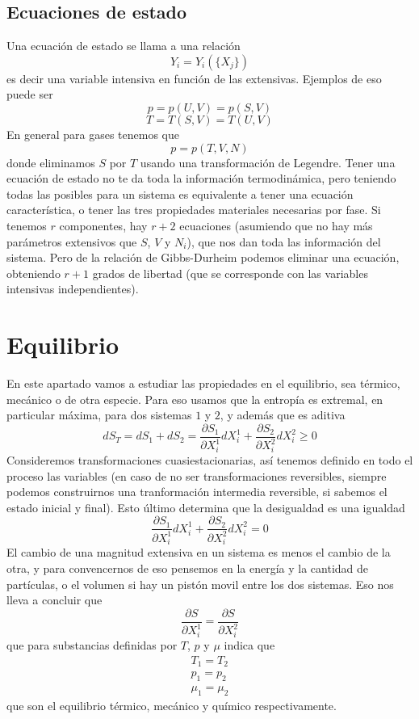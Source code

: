 \subsection{Ecuaciones de estado}
Una ecuación de estado se llama a una relación
\begin{equation}
Y_i = Y_i(\{X_j\})
\end{equation}
es decir una variable intensiva en función de las extensivas.
Ejemplos de eso puede ser
\[p = p(U,V) = p(S,V)\]
\[T = T(S,V) = T(U,V)\]
En general para gases tenemos que
\[p = p(T,V,N)\]
donde eliminamos $S$ por $T$ usando una transformación de Legendre.
Tener una ecuación de estado no te da toda la información termodinámica, pero teniendo todas las posibles para un sistema es equivalente a tener una ecuación característica, o tener las tres propiedades materiales necesarias por fase.
Si tenemos $r$ componentes, hay $r + 2$ ecuaciones (asumiendo que no hay más parámetros extensivos que $S$, $V$ y $N_i$), que nos dan toda las información del sistema.
Pero de la relación de Gibbs-Durheim podemos eliminar una ecuación, obteniendo $r + 1$ grados de libertad (que se corresponde con las variables intensivas independientes).
\section{Equilibrio}
En este apartado vamos a estudiar las propiedades en el equilibrio, sea térmico, mecánico o de otra especie.
Para eso usamos que la entropía es extremal, en particular máxima, para dos sistemas $1$ y $2$, y además que es aditiva
\[ dS_T = dS_1 + dS_2 = \frac{\partial S_1}{\partial X^1_i} dX^1_i + \frac{\partial S_2}{\partial X^2_i} dX^2_i \geq 0\]
Consideremos transformaciones cuasiestacionarias, así tenemos definido en todo el proceso las variables (en caso de no ser transformaciones reversibles, siempre podemos construirnos una tranformación intermedia reversible, si sabemos el estado inicial y final).
Esto último determina que la desigualdad es una igualdad
\[\frac{\partial S_1}{\partial X^1_i} dX^1_i + \frac{\partial S_2}{\partial X^2_i} dX^2_i = 0\]
El cambio de una magnitud extensiva en un sistema es menos el cambio de la otra, y para convencernos de eso pensemos en la energía y la cantidad de partículas, o el volumen si hay un pistón movil entre los dos sistemas.
Eso nos lleva a concluir que
\begin{equation}
\frac{\partial S}{\partial X^1_i} = \frac{\partial S}{\partial X^2_i}
\end{equation}
que para substancias definidas por $T$, $p$ y $\mu$ indica que
\begin{equation}
\begin{gathered}
T_1 = T_2 \\
p_1 = p_2 \\
\mu_1 = \mu_2
\end{gathered}
\end{equation}
que son el equilibrio térmico, mecánico y químico respectivamente.
